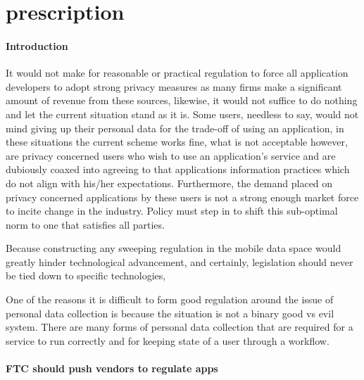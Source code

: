 \section{prescription}

	\paragraph{Introduction}

It would not make for reasonable or practical regulation to force all application developers to adopt strong privacy measures as many firms make a significant amount of revenue from these sources, likewise, it would not suffice to do nothing and let the current situation stand as it is. Some users, needless to say, would not mind giving up their personal data for the trade-off of using an application, in these situations the current scheme works fine, what is not acceptable however, are privacy concerned users who wish to use an application's service and are dubiously coaxed into agreeing to that applications information practices which do not align with his/her expectations. Furthermore, the demand placed on privacy concerned applications by these users is not a strong enough market force to incite change in the industry. Policy must step in to shift this sub-optimal norm to one that satisfies all parties. 


Because constructing any sweeping regulation in the mobile data space would greatly hinder technological advancement\cite{???}, and certainly, legislation should never be tied down to specific technologies, 


One of the reasons it is difficult to form good regulation around the issue of personal data collection is because the situation is not a binary good vs evil system. There are many forms of personal data collection that are required for a service to run correctly and for keeping state of a user through a workflow. 




\paragraph{FTC should push vendors to regulate apps}





